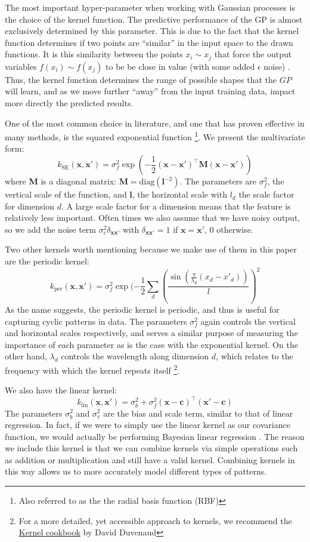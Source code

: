 \documentclass[letterpaper, 11 pt, conference]{ieeeconf}  %
\newcommand{\bx}{\textbf{x}}
\begin{document}
The most important hyper-parameter when working with Gaussian processes is the choice of the kernel function. The predictive performance of the GP is almost exclusively determined by this parameter. This is due to the fact that the kernel function determines if two points are ``similar'' in the input space to the drawn functions. It is this similarity between the points $x_i \sim x_j$ that force the output variables $f(x_i) \sim f(x_j)$ to be be close in value (with some added $\epsilon$ noise) \cite{c2}. Thus, the kernel function determines the range of possible shapes that the $GP$ will learn, and as we move further ``away'' from the input training data, impact more directly the predicted results.

One of the most common choice in literature, and one that has proven effective in many methods, is the squared exponential function \footnote{Also referred to as the the radial basis function (RBF)}. We present the multivariate form:
$$k_{\text{SE}}(\bx, \bx') = \sigma_f^2 \exp(-\frac{1}{2}(\bx - \bx')^\top \textbf{M} (\bx - \bx'))$$
where \textbf{M} is a diagonal matrix: $\textbf{M} = \text{diag}(\textbf{l}^{-2})$. The parameters are $\sigma_f^2$, the vertical scale of the function, and $\textbf{l}$, the horizontal scale with $l_d$ the scale factor for dimension $d$. A large scale factor for a dimension means that the feature is relatively less important. Often times we also assume that we have noisy output, so we add the noise term $\sigma_\epsilon^2 \delta_{\bx\bx'}$ with $\delta_{\bx\bx'} = 1$ if $\bx = \bx'$, $0$ otherwise.

Two other kernels worth mentioning because we make use of them in this paper are the periodic kernel:
$$k_{\text{per}}(\bx, \bx') = \sigma_f^2 \exp(-\frac{1}{2} \sum_d (\frac{\sin(\frac{\pi}{\lambda_d} (x_d - x'_d))}{l})^2$$
As the name suggests, the periodic kernel is periodic, and thus is useful for capturing cyclic patterns in data. The parameters $\sigma_f^2$ again controls the vertical and horizontal scales respectively, and serves a similar purpose of measuring the importance of each parameter as is the case with the exponential kernel. On the other hand, $\lambda_d$ controls the wavelength along dimension $d$, which relates to the frequency with which the kernel repeats itself \footnote{For a more detailed, yet accessible approach to kernels, we recommend the \href{http://people.seas.harvard.edu/~dduvenaud/cookbook/}{Kernel cookbook} by David Duvenaud}. 

We also have the linear kernel:
$$k_{\text{lin}}(\bx, \bx') = \sigma_b^2 + \sigma_f^2(\bx - \textbf{c})^\top(\bx' - \textbf{c})$$
The parameters $\sigma_b^2$ and $\sigma_v^2$ are the bias and scale term, similar to that of linear regression. In fact, if we were to simply use the linear kernel as our covariance function, we would actually be performing Bayesian linear regression \cite{c3}. The reason we include this kernel is that we can combine kernels via simple operations such as addition or multiplication and still have a valid kernel. Combining kernels in this way allows us to more accurately model different types of patterns.
\end{document}
